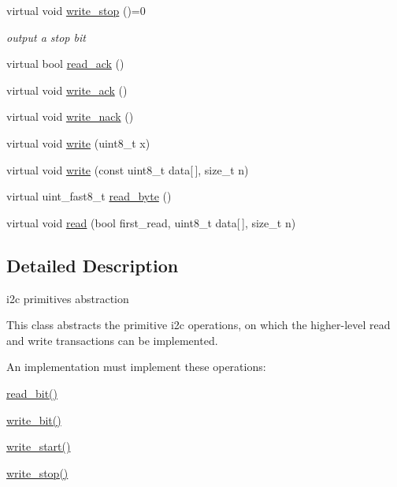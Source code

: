 \begin{DoxyCompactItemize}
virtual void \hyperlink{classhwlib_1_1i2c__primitives_a557e3b1319ec01ec0e1f850b24915aa9}{write\+\_\+stop} ()=0
\begin{DoxyCompactList}\small\item\em output a stop bit \end{DoxyCompactList}\item 
virtual bool \hyperlink{classhwlib_1_1i2c__primitives_adfa6c493163d397f58a3e2ba4617dbac}{read\+\_\+ack} ()
\item 
virtual void \hyperlink{classhwlib_1_1i2c__primitives_a711df86e5129b7daeff7a622b7b734c6}{write\+\_\+ack} ()
\item 
virtual void \hyperlink{classhwlib_1_1i2c__primitives_a5ca312553bc0817ffecf5f90caf96396}{write\+\_\+nack} ()
\item 
virtual void \hyperlink{classhwlib_1_1i2c__primitives_aa5227ae39d6dd5957cf47b0b761b475b}{write} (uint8\+\_\+t x)
\item 
virtual void \hyperlink{classhwlib_1_1i2c__primitives_ac1b43fe4971b5df06a0b45f2154e7864}{write} (const uint8\+\_\+t data\mbox{[}$\,$\mbox{]}, size\+\_\+t n)
\item 
virtual uint\+\_\+fast8\+\_\+t \hyperlink{classhwlib_1_1i2c__primitives_a21c9843d3a7801781e576013a1e154f9}{read\+\_\+byte} ()
\item 
virtual void \hyperlink{classhwlib_1_1i2c__primitives_a2a8cc988531ea774d39d726f213f8585}{read} (bool first\+\_\+read, uint8\+\_\+t data\mbox{[}$\,$\mbox{]}, size\+\_\+t n)
\end{DoxyCompactItemize}


\subsection{Detailed Description}
i2c primitives abstraction

This class abstracts the primitive i2c operations, on which the higher-\/level read and write transactions can be implemented.

An implementation must implement these operations\+:
\begin{DoxyItemize}
\item \hyperlink{classhwlib_1_1i2c__primitives_a55a6e105449bcba89fd329a80a065f2c}{read\+\_\+bit()}
\item \hyperlink{classhwlib_1_1i2c__primitives_a959052f7d29732c4371895b29f4e0b64}{write\+\_\+bit()}
\item \hyperlink{classhwlib_1_1i2c__primitives_adc2fc22b39cc81a9871f64325e8e3911}{write\+\_\+start()}
\item \hyperlink{classhwlib_1_1i2c__primitives_a557e3b1319ec01ec0e1f850b24915aa9}{write\+\_\+stop()}
\end{DoxyItemize}

